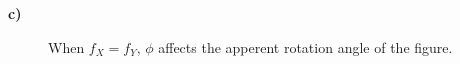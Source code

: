 \documentclass[12pt]{article}
\begin{document}
		\indent\textbf{\large c)}
		\begin{figure}[H]
			\centering
		\end{figure}
		\begin{figure}[ht]
			\renewcommand{\thesubfigure}{c}
			\renewcommand{\thesubfigure}{d}
			\caption{When $f_X = f_Y$, $\phi$ affects the apperent rotation angle of the figure.}\label{fig:3c}
		\end{figure}
	
	\newpage	
		
\end{document}
